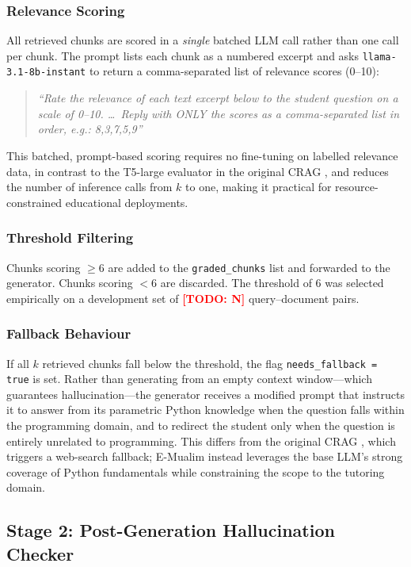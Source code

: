 \documentclass[conference]{IEEEtran}
\newcommand{\todo}[1]{\textcolor{red}{\textbf{[TODO: #1]}}}
\begin{document}
\subsubsection{Relevance Scoring}
All retrieved chunks are scored in a \emph{single} batched LLM call
rather than one call per chunk.
The prompt lists each chunk as a numbered excerpt and asks
\texttt{llama-3.1-8b-instant} to return a comma-separated list of
relevance scores (0--10):
\begin{quote}
\textit{``Rate the relevance of each text excerpt below to the
student question on a scale of 0--10. \ldots\ Reply with ONLY the
scores as a comma-separated list in order, e.g.: 8,3,7,5,9''}
\end{quote}
This batched, prompt-based scoring requires no fine-tuning on
labelled relevance data, in contrast to the T5-large evaluator in
the original CRAG \cite{yan2024crag}, and reduces the number of
inference calls from $k$ to one, making it practical for
resource-constrained educational deployments.

\subsubsection{Threshold Filtering}
Chunks scoring $\geq 6$ are added to the \texttt{graded\_chunks}
list and forwarded to the generator.
Chunks scoring $< 6$ are discarded.
The threshold of 6 was selected empirically on a development set
of \todo{N} query--document pairs.

\subsubsection{Fallback Behaviour}
If all $k$ retrieved chunks fall below the threshold, the flag
\texttt{needs\_fallback = true} is set.
Rather than generating from an empty context window---which
guarantees hallucination---the generator receives a modified prompt
that instructs it to answer from its parametric Python knowledge
when the question falls within the programming domain, and to
redirect the student only when the question is entirely unrelated
to programming.
This differs from the original CRAG \cite{yan2024crag}, which
triggers a web-search fallback; E-Mualim instead leverages the
base LLM's strong coverage of Python fundamentals while
constraining the scope to the tutoring domain.

\subsection{Stage 2: Post-Generation Hallucination Checker}
\end{document}
